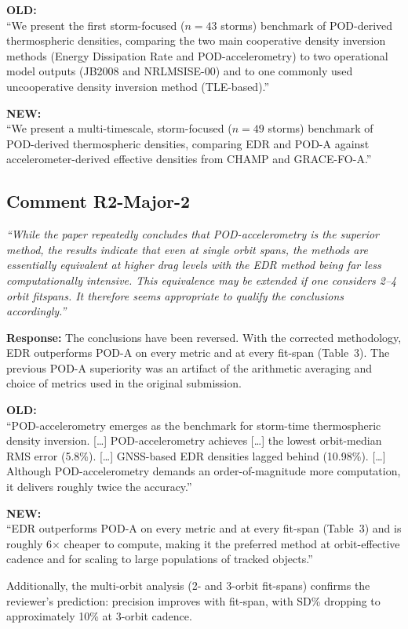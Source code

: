 \documentclass[11pt]{article}
\newcommand{\reviewercomment}[1]{%
  \medskip
  \noindent\textit{\color{reviewblue}#1}%
  \medskip
}
\newcommand{\oldtext}[1]{%
  \smallskip
  \noindent\hspace{1em}\begin{minipage}{0.92\textwidth}%
  \color{quotegray}\textbf{OLD:}\\[2pt]``#1''%
  \end{minipage}%
  \smallskip
}
\newcommand{\newtext}[1]{%
  \smallskip
  \noindent\hspace{1em}\begin{minipage}{0.92\textwidth}%
  \color{quotegreen}\textbf{NEW:}\\[2pt]``#1''%
  \end{minipage}%
  \smallskip
}
\begin{document}
\oldtext{We present the first storm-focused ($n=43$ storms) benchmark of POD-derived thermospheric densities, comparing the two main cooperative density inversion methods (Energy Dissipation Rate and POD-accelerometry) to two operational model outputs (JB2008 and NRLMSISE-00) and to one commonly used uncooperative density inversion method (TLE-based).}

\newtext{We present a multi-timescale, storm-focused ($n=49$ storms) benchmark of POD-derived thermospheric densities, comparing EDR and POD-A against accelerometer-derived effective densities from CHAMP and GRACE-FO-A.}


\subsection{Comment R2-Major-2}

\reviewercomment{%
``While the paper repeatedly concludes that POD-accelerometry is the superior method, the results indicate that even at single orbit spans, the methods are essentially equivalent at higher drag levels with the EDR method being far less computationally intensive. This equivalence may be extended if one considers 2--4 orbit fitspans. It therefore seems appropriate to qualify the conclusions accordingly.''}

\textbf{Response:}
The conclusions have been reversed. With the corrected methodology, EDR outperforms POD-A on every metric and at every fit-span (Table~3). The previous POD-A superiority was an artifact of the arithmetic averaging and choice of metrics used in the original submission.

\oldtext{POD-accelerometry emerges as the benchmark for storm-time thermospheric density inversion. [\ldots] POD-accelerometry achieves [\ldots] the lowest orbit-median RMS error (5.8\%). [\ldots] GNSS-based EDR densities lagged behind (10.98\%). [\ldots] Although POD-accelerometry demands an order-of-magnitude more computation, it delivers roughly twice the accuracy.}

\newtext{EDR outperforms POD-A on every metric and at every fit-span (Table~3) and is roughly 6$\times$ cheaper to compute, making it the preferred method at orbit-effective cadence and for scaling to large populations of tracked objects.}

Additionally, the multi-orbit analysis (2- and 3-orbit fit-spans) confirms the reviewer's prediction: precision improves with fit-span, with SD\% dropping to approximately 10\% at 3-orbit cadence.
\end{document}
